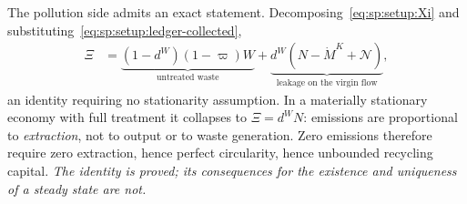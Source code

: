 \begin{itemize}
The pollution side admits an exact statement. Decomposing~\eqref{eq:sp:setup:Xi} and substituting~\eqref{eq:sp:setup:ledger-collected},
\begin{align}
\Xi &= \underbrace{\left(1-d^W\right)\left(1-\varpi\right)W}_{\text{untreated waste}}+\underbrace{d^W\left(N-\dot M^K+\mathcal N\right)}_{\text{leakage on the virgin flow}},
\label{eq:sp:emissions-decomposition}
\end{align}
an identity requiring no stationarity assumption. In a materially stationary economy with full treatment it collapses to $\Xi=d^WN$: emissions are proportional to \emph{extraction}, not to output or to waste generation. Zero emissions therefore require zero extraction, hence perfect circularity, hence unbounded recycling capital. \emph{The identity is proved; its consequences for the existence and uniqueness of a steady state are not.}
\end{itemize}
